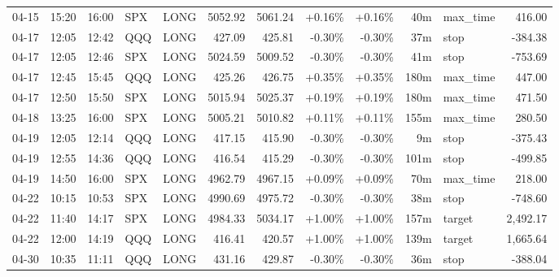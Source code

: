 \documentclass[11pt,a4paper]{article}
\begin{document}
\begin{center}
\begin{longtable}{>{\color{txtmain}}l l l l l r r r r r >{\color{txtmain}}l r}
04-15 & 15:20 & 16:00 & SPX & LONG & 5052.92 & 5061.24 & \textcolor{wingreen}{+0.16\%} & \textcolor{wingreen}{+0.16\%} & 40m & max\_time & \textcolor{wingreen}{416.00} \\
04-17 & 12:05 & 12:42 & QQQ & LONG & 427.09 & 425.81 & \textcolor{lossred}{-0.30\%} & \textcolor{lossred}{-0.30\%} & 37m & stop & \textcolor{lossred}{-384.38} \\
04-17 & 12:05 & 12:46 & SPX & LONG & 5024.59 & 5009.52 & \textcolor{lossred}{-0.30\%} & \textcolor{lossred}{-0.30\%} & 41m & stop & \textcolor{lossred}{-753.69} \\
04-17 & 12:45 & 15:45 & QQQ & LONG & 425.26 & 426.75 & \textcolor{wingreen}{+0.35\%} & \textcolor{wingreen}{+0.35\%} & 180m & max\_time & \textcolor{wingreen}{447.00} \\
04-17 & 12:50 & 15:50 & SPX & LONG & 5015.94 & 5025.37 & \textcolor{wingreen}{+0.19\%} & \textcolor{wingreen}{+0.19\%} & 180m & max\_time & \textcolor{wingreen}{471.50} \\
04-18 & 13:25 & 16:00 & SPX & LONG & 5005.21 & 5010.82 & \textcolor{wingreen}{+0.11\%} & \textcolor{wingreen}{+0.11\%} & 155m & max\_time & \textcolor{wingreen}{280.50} \\
04-19 & 12:05 & 12:14 & QQQ & LONG & 417.15 & 415.90 & \textcolor{lossred}{-0.30\%} & \textcolor{lossred}{-0.30\%} & 9m & stop & \textcolor{lossred}{-375.43} \\
04-19 & 12:55 & 14:36 & QQQ & LONG & 416.54 & 415.29 & \textcolor{lossred}{-0.30\%} & \textcolor{lossred}{-0.30\%} & 101m & stop & \textcolor{lossred}{-499.85} \\
04-19 & 14:50 & 16:00 & SPX & LONG & 4962.79 & 4967.15 & \textcolor{wingreen}{+0.09\%} & \textcolor{wingreen}{+0.09\%} & 70m & max\_time & \textcolor{wingreen}{218.00} \\
04-22 & 10:15 & 10:53 & SPX & LONG & 4990.69 & 4975.72 & \textcolor{lossred}{-0.30\%} & \textcolor{lossred}{-0.30\%} & 38m & stop & \textcolor{lossred}{-748.60} \\
04-22 & 11:40 & 14:17 & SPX & LONG & 4984.33 & 5034.17 & \textcolor{wingreen}{+1.00\%} & \textcolor{wingreen}{+1.00\%} & 157m & target & \textcolor{wingreen}{2,492.17} \\
04-22 & 12:00 & 14:19 & QQQ & LONG & 416.41 & 420.57 & \textcolor{wingreen}{+1.00\%} & \textcolor{wingreen}{+1.00\%} & 139m & target & \textcolor{wingreen}{1,665.64} \\
04-30 & 10:35 & 11:11 & QQQ & LONG & 431.16 & 429.87 & \textcolor{lossred}{-0.30\%} & \textcolor{lossred}{-0.30\%} & 36m & stop & \textcolor{lossred}{-388.04} \\

\end{longtable}
\end{center}
\end{document}
